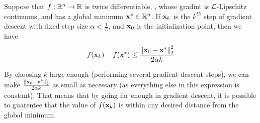 \begin{theorem}
    Suppose that $f : \R^n \rightarrow \R$ is twice differentiable, \cvx, whose gradint is $\Lip$-Lipschitz continuous, and has a global minimum $\vx^* \in \R^n$. 
    If $\vx_{k}$ is the $k^{th}$ step of gradient descent with fixed step size $\alpha < \frac{1}{L}$, and $\vx_0$ is the initialization point, then we have
    $$f(\vx_k) - f(\vx^*) \leq \frac{\norm{\vx_0 - \vx^*}_2^2}{2\alpha k}$$
\end{theorem}

\begin{remark}
    By choosing $k$ large enough (performing several gradient descent steps), we can make $\frac{\norm{\vx_0 - \vx^*}_2^2}{2\alpha k}$ as small as necessary (as everything else in this expression is constant). That means that by going far enough in gradient descent, it is possible to guarentee that the value of $f(\vx_k)$ is within any desired distance from the global minimum.
\end{remark}

